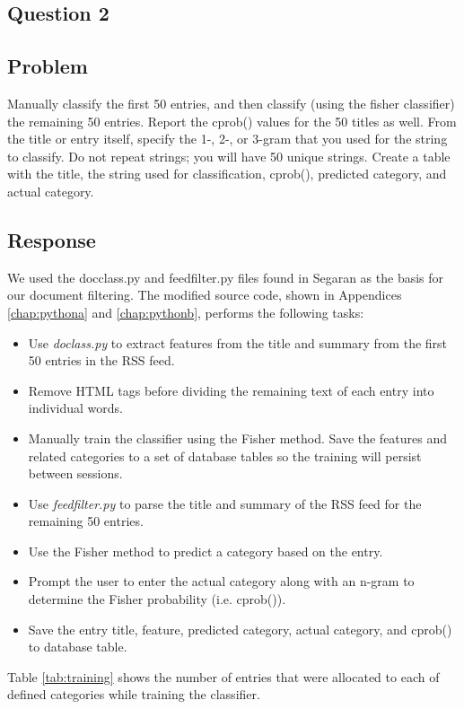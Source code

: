 \documentclass[letterpaper,11pt]{report}
\begin{document}
\begin{savenotes}
\section{Question 2}
\subsection{Problem}Manually classify the first 50 entries, and then classify (using the fisher classifier) the remaining 50 entries. Report the cprob() values for the 50 titles as well.  From the title or entry itself, specify the 1-, 2-, or 3-gram that you used for the string to classify.  Do not repeat strings; you will have 50 unique strings. Create a table with the title, the string used for classification, cprob(), predicted category, and actual category.
\subsection{Response}We used the docclass.py and feedfilter.py files found in Segaran \cite{segaran2007programming} as the basis for our document filtering. The modified source code, shown in Appendices \ref{chap:pythona} and \ref{chap:pythonb}, performs the following tasks:

\begin{itemize}
\item Use \emph{doclass.py} to extract features from the title and summary from the first 50 entries in the RSS feed. 
\item Remove HTML tags before dividing the remaining text of each entry into individual words.
\item Manually train the classifier using the Fisher method. Save the features and related categories to a set of database tables so the training will persist between sessions.
\item Use \emph{feedfilter.py} to parse the title and summary of the RSS feed for the remaining 50 entries.
\item Use the Fisher method to predict a category based on the entry.
\item Prompt the user to enter the actual category along with an n-gram to determine the Fisher probability (i.e. cprob()).
\item Save the entry title, feature, predicted category, actual category, and cprob() to database table.
\end{itemize}

Table \ref{tab:training} shows the number of entries that were allocated to each of defined categories while training the classifier.


\end{savenotes}
\end{document}
